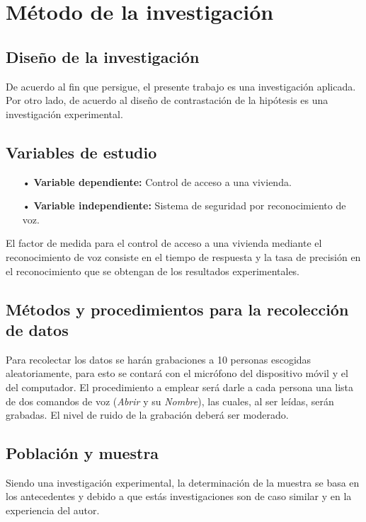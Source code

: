 \section{Método de la investigación}
\subsection{Diseño de la investigación}
De acuerdo al fin que persigue, el presente trabajo es una investigación aplicada. Por otro lado, de acuerdo al diseño de contrastación de la hipótesis es una investigación experimental.

\subsection{Variables de estudio}
\begin{enumerate}
\item[•]\textbf{Variable dependiente:} Control de acceso a una vivienda.
\item[•]\textbf{Variable independiente:} Sistema de seguridad por reconocimiento de voz.
\end{enumerate}

El factor de medida para el control de acceso a una vivienda mediante el reconocimiento de voz consiste en el tiempo de respuesta y la tasa de precisión en el reconocimiento que se obtengan de los resultados experimentales.

\subsection{Métodos y procedimientos para la recolección de datos}
Para recolectar los datos se harán grabaciones a 10 personas escogidas aleatoriamente, para esto se contará con el micrófono del dispositivo móvil y el del computador. El procedimiento a emplear será darle a cada persona una lista de dos comandos de voz (\textit{Abrir} y su \textit{Nombre}), las cuales, al ser leídas, serán grabadas. El nivel de ruido de la grabación deberá ser moderado.

\subsection{Población y muestra}
Siendo una investigación experimental, la determinación de la muestra se basa en los antecedentes \cite{eyra} y \cite{varela} debido a que estás investigaciones son de caso similar y en la experiencia del autor.
